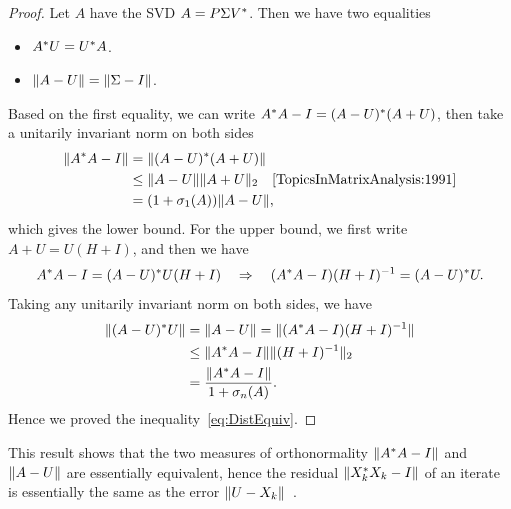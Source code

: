 \documentclass[12pt]{article}
\begin{document}
\begin{proof}
    Let $A$ have the SVD $A=P\Sigma V^*$. Then we have two equalities 
    \begin{itemize}
        \item $A^* U = U^* A$.
        \item $\|{A-U}\| = \|{\Sigma - I}\|$.
    \end{itemize}
    Based on the first equality, we can write $A^* A - I = (A-U)^* (A+U)$, then take a unitarily invariant norm on both sides 
    \begin{equation}
        \notag 
        \begin{aligned}
            \gnorm{A\ctp A - I} &= \gnorm{(A-U)\ctp (A+U)} \\
            & \leq \gnorm{A-U}\tnorm{A+U}\quad \text{\ycite[1991, Cor.~3.5.10]{TopicsInMatrixAnalysis:1991}}\\
            & = (1+\sigma_1(A))\gnorm{A-U},
        \end{aligned}
    \end{equation}
    which gives the lower bound. For the upper bound, we first write $A+U=U(H+I)$, and then we have 
    \begin{equation}
        \notag 
        A^* A - I = (A - U)^* U(H+I)\quad \Rightarrow \quad (A^* A - I)(H + I)^{-1} = (A-U)^* U.
    \end{equation}
    Taking any unitarily invariant norm on both sides, we have 
    \begin{equation}
        \notag
        \begin{aligned}
            \|{(A-U)^* U}\| &= \|{A-U}\| = \|{(A^* A - I)(H + I)^{-1}}\|\\
            & \leq \|{A^* A - I}\|\|{(H+I)^{-1}}\|_2 \\
            & = \frac{\|{A^* A - I}\|}{1+\sigma_n(A)}.
        \end{aligned}
    \end{equation}
    Hence we proved the inequality~\eqref{eq:DistEquiv}.
\end{proof}

This result shows that the two measures of orthonormality $\|{A^* A - I}\|$ and $\|{A-U}\|$ are essentially equivalent, hence the residual $\|{X_k^* X_k - I}\|$ of an iterate is essentially the same as the error $\|{U-X_k}\|$~.
\end{document}

